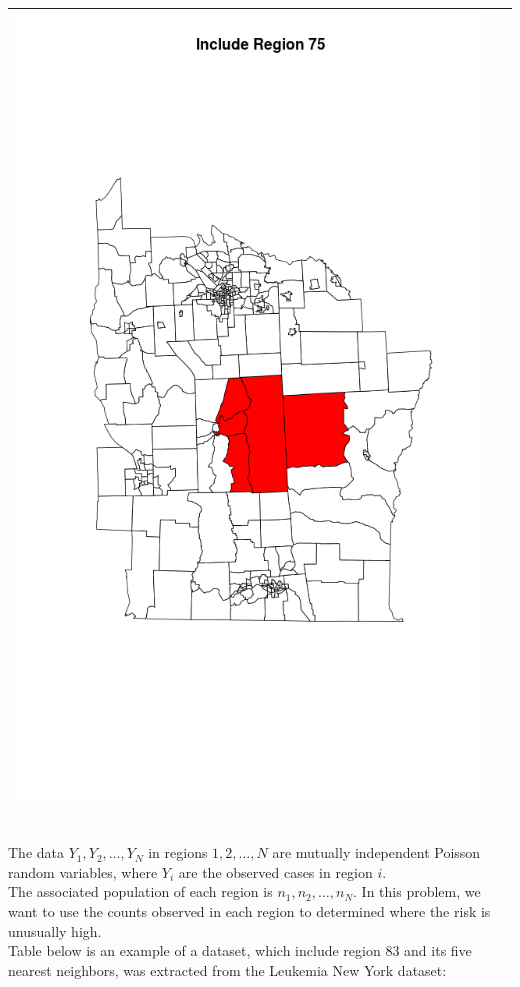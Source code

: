 \documentclass[12pt]{article}
\begin{document}
\begin{tabular}{|c|c|c|}
									\includegraphics[scale=0.2]{ny75.png} && \\
		\hline	
		\end{tabular}	\\
			The data $Y_1,Y_2,\dots,Y_N$ in regions $1,2,\dots,N$ are mutually independent Poisson random variables, where $Y_i$ are the observed cases in region $i$. \\ 
			The associated population of each region is $n_1,n_2,\dots,n_N$. In this problem, we want to use the counts observed in each region to determined where the risk is unusually high.\\
Table below is an example of a dataset, which include region 83 and its five nearest neighbors, was extracted from the Leukemia New York dataset: \\
\end{document}
